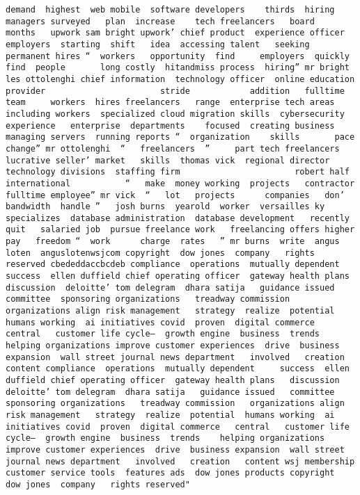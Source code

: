 \documentclass[
]{article}
\begin{document}
\begin{verbatim}
demand  highest  web mobile  software developers    thirds  hiring managers surveyed   plan  increase    tech freelancers   board     months   upwork sam bright upwork’ chief product  experience officer  employers  starting  shift   idea  accessing talent   seeking permanent hires “  workers   opportunity  find     employers  quickly find  people       long costly  hitandmiss process  hiring” mr bright  les ottolenghi chief information  technology officer  online education provider                       stride            addition   fulltime team     workers  hires freelancers   range  enterprise tech areas including workers  specialized cloud migration skills  cybersecurity experience   enterprise  departments    focused  creating business   managing servers  running reports “  organization    skills       pace  change” mr ottolenghi  “   freelancers  ”     part tech freelancers   lucrative seller’ market   skills  thomas vick  regional director   technology divisions  staffing firm                       robert half international           “   make  money working  projects   contractor       fulltime employee” mr vick  “   lot   projects      companies   don’   bandwidth  handle ”   josh burns  yearold  worker  versailles ky  specializes  database administration  database development   recently quit   salaried job  pursue freelance work   freelancing offers higher pay   freedom “  work      charge  rates   ” mr burns  write  angus loten  anguslotenwsjcom copyright  dow jones  company   rights reserved cbededdaccbcdeb compliance  operations  mutually dependent     success  ellen duffield chief operating officer  gateway health plans   discussion  deloitte’ tom delegram  dhara satija   guidance issued   committee  sponsoring organizations   treadway commission   organizations align risk management   strategy  realize  potential  humans working  ai initiatives covid  proven  digital commerce   central   customer life cycle—  growth engine  business  trends    helping organizations improve customer experiences  drive  business expansion  wall street journal news department   involved   creation   content compliance  operations  mutually dependent     success  ellen duffield chief operating officer  gateway health plans   discussion  deloitte’ tom delegram  dhara satija   guidance issued   committee  sponsoring organizations   treadway commission   organizations align risk management   strategy  realize  potential  humans working  ai initiatives covid  proven  digital commerce   central   customer life cycle—  growth engine  business  trends    helping organizations improve customer experiences  drive  business expansion  wall street journal news department   involved   creation   content wsj membership customer service tools  features ads  dow jones products copyright   dow jones  company   rights reserved"                                                                                                                                                                                                                                                                                                                                                                                                                                                                                 
\end{verbatim}
\end{document}
